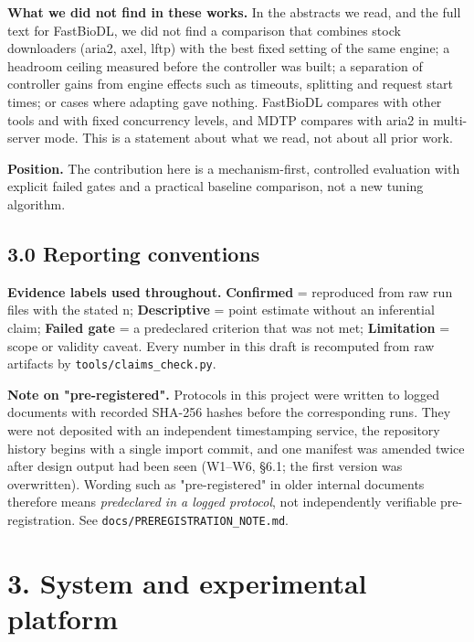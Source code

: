 \documentclass[conference]{IEEEtran}
\begin{document}
\textbf{What we did not find in these works.} In the abstracts we read, and the full text for FastBioDL, we did not find a comparison that combines stock downloaders (aria2, axel, lftp) with the best fixed setting of the same engine; a headroom ceiling measured before the controller was built; a separation of controller gains from engine effects such as timeouts, splitting and request start times; or cases where adapting gave nothing. FastBioDL compares with other tools and with fixed concurrency levels, and MDTP compares with aria2 in multi-server mode. This is a statement about what we read, not about all prior work.


\textbf{Position.} The contribution here is a mechanism-first, controlled evaluation with explicit failed gates and a practical baseline comparison, not a new tuning algorithm.


\subsection*{3.0 Reporting conventions}



\textbf{Evidence labels used throughout.} \textbf{Confirmed} = reproduced from raw run files with the stated n; \textbf{Descriptive} = point estimate without an inferential claim; \textbf{Failed gate} = a predeclared criterion that was not met; \textbf{Limitation} = scope or validity caveat. Every number in this draft is recomputed from raw artifacts by \texttt{tools/\allowbreak{}claims\_check.py}.


\textbf{Note on "pre-registered".} Protocols in this project were written to logged documents with recorded SHA-256 hashes before the corresponding runs. They were not deposited with an independent timestamping service, the repository history begins with a single import commit, and one manifest was amended twice after design output had been seen (W1–W6, §6.1; the first version was overwritten). Wording such as "pre-registered" in older internal documents therefore means \emph{predeclared in a logged protocol}, not independently verifiable pre-registration. See \texttt{docs/\allowbreak{}PREREGISTRATION\_NOTE.md}.



\section*{3. System and experimental platform}
\end{document}
